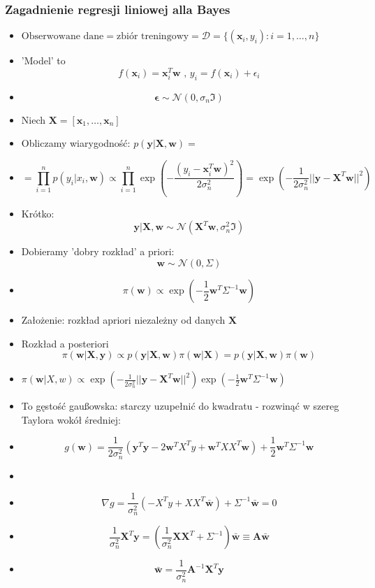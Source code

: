 \documentclass[draft, xetex]{beamer}
\newcommand{\xxx}{\mathbf{x}}
\newcommand{\www}{\mathbf{w}}
\newcommand{\yyy}{\mathbf{y}}
\newcommand{\X}{\mathbf{X}}
\newcommand{\A}{\mathbf{A}}
\newcommand{\eps}{\mathbf{\epsilon}}
\begin{document}
\begin{frame}
	\frametitle{Zagadnienie regresji liniowej alla Bayes}

	\begin{itemize}
		\item $\text{Obserwowane dane} = \text{zbiór treningowy} = \mathcal{D} = \{ (\mathbf{x}_i, y_i): i = 1, \dots, n\}$
		\item 'Model' to $$f(\xxx_i) = \xxx_i^T \www \text{  ,  } y_i = f(\xxx_i) + \epsilon_i$$
		
		\item $$\eps \sim \mathcal{N}(\mathfrak{0}, \sigma_n \mathfrak{I})$$
		\item Niech $\X = [\xxx_1, \dots, \xxx_n]$
		\item Obliczamy wiarygodność: $p(\yyy | \X, \www) = $
		\item $$= \prod_{i=1}^n p(y_i | x_i, \www) \propto \prod_{i=1}^n  \exp(- \frac{(y_i - \xxx_i^T \www)^2}{2\sigma_n^2}) = \exp( - \frac{1}{2\sigma_n^2} ||\yyy- \X^T \www||^2)$$
	\end{itemize}
\end{frame}

\begin{frame}
	\begin{itemize}
		\item Krótko: $$\yyy | \X, \www \sim \mathcal{N}(\X^T \www, \sigma_n^2 \mathfrak{I} )$$
		\item Dobieramy 'dobry rozkład' a priori: $$\www \sim \mathcal{N}(\mathfrak{0}, \Sigma)$$
		\item $$\pi(\www) \propto \exp (- \frac{1}{2}\www^T \Sigma^{-1} \www)$$
		\item Założenie: rozkład apriori niezależny od danych $\X$
		\item Rozkład a posteriori $$\pi(\www | \X, \yyy) \propto p(\yyy| \X, \www) \pi(\www | \X) = p(\yyy| \X, \www) \pi(\www)$$
	\end{itemize}
\end{frame}

\begin{frame}
	\begin{itemize}
		\item $\pi(\www | X,w) \propto \exp( - \frac{1}{2\sigma_n^2} ||\yyy- \X^T \www||^2)\exp (- \frac{1}{2}\www^T \Sigma^{-1} \www)$
		\item To gęstość gau\ss owska: starczy uzupełnić do kwadratu - rozwinąć w szereg Taylora wokół średniej:
		\item $$g(\www) = \frac{1}{2\sigma^2_n}( \yyy^T\yyy - 2 \www^T X^T y + \www^T X X^T \www) + \frac{1}{2}\www^T \Sigma^{-1} \www$$
		\item
		\item $$\nabla g = \frac{1}{\sigma^2_n} (- X^T y + X X^T \bar{\www}) + \Sigma^{-1} \bar{\www} = \mathfrak{0}$$
		\item $$\frac{1}{\sigma_n^2} \X^T \yyy = (\frac{1}{\sigma^2_n} \X \X^T + \Sigma^{-1}) \bar{\www} \equiv \A \bar{\www}$$
		\item $$ \bar{\www} = \frac{1}{\sigma^2_n} \A^{-1} \X^T \yyy$$
	\end{itemize}
\end{frame}
\end{document}
